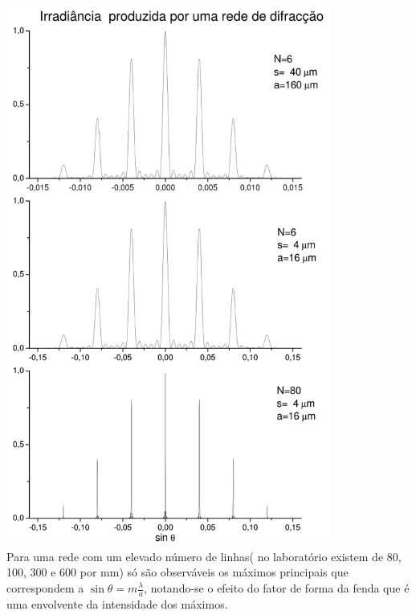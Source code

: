 \documentclass[a4paper,12pt]{article}
\begin{document}
\begin{center}
	\includegraphics[width=0.8\textwidth]{figura8.png} \\ %
Para uma rede com um elevado número de linhas( no laboratório existem de 80, 100, 300 e 600 por mm) só são observáveis os máximos principais que correspondem a $\sin \theta =m\frac{\lambda}{a} $, notando-se o efeito do fator de forma da fenda que é uma envolvente da intensidade dos máximos.
\end{center}

\end{document}
